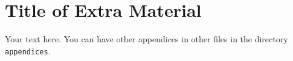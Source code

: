 \chapter{Title of Extra Material}
\label{app:extra}
\begin{instructions}
Your text here. You can have other appendices in other files in the directory \texttt{appendices}.
\end{instructions}
